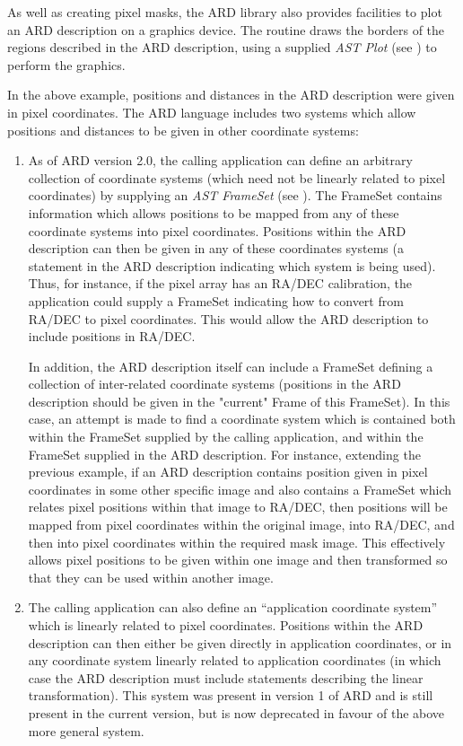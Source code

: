 \documentclass[11pt,nolof]{starlink}
\begin{document}
As well as creating pixel masks, the ARD library also provides facilities
to plot an ARD description on a graphics device. The 
routine draws the borders of the regions described in the ARD description,
using a supplied \emph{AST Plot} (see ) to perform
the graphics.

In the above example, positions and distances in the ARD description were given
in pixel coordinates. The ARD language includes two systems which allow
positions and distances to be given in other coordinate systems:
\begin{enumerate}

\item As of ARD version 2.0, the calling application can define an
arbitrary collection of coordinate systems (which need not be linearly
related to pixel coordinates) by supplying an \emph{AST FrameSet} (see
). The FrameSet contains information which allows
positions to be mapped from any of these coordinate systems into pixel
coordinates. Positions within the ARD description can then be given
in any of these coordinates systems (a statement in the ARD description
indicating which system is being used). Thus, for instance, if the pixel
array has an RA/DEC calibration, the application could supply a FrameSet
indicating how to convert from RA/DEC to pixel coordinates. This would
allow the ARD description to include positions in RA/DEC.

In addition, the ARD description itself can include a FrameSet defining
a collection of inter-related coordinate systems (positions in the ARD
description should be given in the "current" Frame of this FrameSet). In
this case, an attempt is made to find a coordinate system which is
contained both within the FrameSet supplied by the calling application,
and within the FrameSet supplied in the ARD description. For instance,
extending the previous example, if an ARD description contains position
given in pixel coordinates in some other specific image and also contains a
FrameSet which relates pixel positions within that image to RA/DEC, then
positions will be mapped from pixel coordinates within the original
image, into RA/DEC, and then into pixel coordinates within the required
mask image. This effectively allows pixel positions to be given within
one image and then transformed so that they can be used within another
image.

\item The calling application can also define an ``application coordinate
system'' which is linearly related to pixel coordinates. Positions within the
ARD description can then either be given directly in application coordinates,
or in any coordinate system linearly related to application coordinates
(in which case the ARD description must include statements describing the
linear transformation). This system was present in version 1 of ARD and
is still present in the current version, but is now deprecated in favour
of the above more general system.

\end{enumerate}
\end{document}

